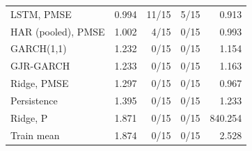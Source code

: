\begin{tabular}{lrrrr}
LSTM, PMSE & 0.994 & 11/15 & 5/15 & 0.913 \\
HAR (pooled), PMSE & 1.002 & 4/15 & 0/15 & 0.993 \\
GARCH(1,1) & 1.232 & 0/15 & 0/15 & 1.154 \\
GJR-GARCH & 1.233 & 0/15 & 0/15 & 1.163 \\
Ridge, PMSE & 1.297 & 0/15 & 0/15 & 0.967 \\
Persistence & 1.395 & 0/15 & 0/15 & 1.233 \\
Ridge, P & 1.871 & 0/15 & 0/15 & 840.254 \\
Train mean & 1.874 & 0/15 & 0/15 & 2.528 \\
\bottomrule
\end{tabular}

